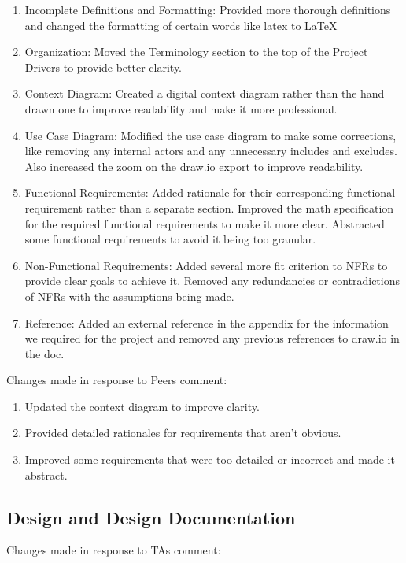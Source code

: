 \documentclass{article}
\begin{document}
	\begin{enumerate}
		\item Incomplete Definitions and Formatting: Provided more thorough definitions and changed the formatting of certain words like latex to LaTeX
		\item Organization: Moved the Terminology section to the top of the Project Drivers to provide better clarity. 
		\item Context Diagram: Created a digital context diagram rather than the hand drawn one to improve readability and make it more professional. 
		\item Use Case Diagram: Modified the use case diagram to make some corrections, like removing any internal actors and any unnecessary includes and excludes. Also increased the zoom on the draw.io export to improve readability. 
		\item Functional Requirements: Added rationale for their corresponding functional requirement rather than a separate section. Improved the math specification for the required functional requirements to make it more clear. Abstracted some functional requirements to avoid it being too granular. 
		\item Non-Functional Requirements: Added several more fit criterion to NFRs to provide clear goals to achieve it. Removed any redundancies or contradictions of NFRs with the assumptions being made. 
		\item Reference: Added an external reference in the appendix for the information we required for the project and removed any previous references to draw.io in the doc. 
	\end{enumerate}
	
	\noindent Changes made in response to Peers comment:
	
	\begin{enumerate}
		\item Updated the context diagram to improve clarity. 
		\item Provided detailed rationales for requirements that aren't obvious. 
		\item Improved some requirements that were too detailed or incorrect and made it abstract. 
	\end{enumerate}
	
	\subsection{Design and Design Documentation}
	
	Changes made in response to TAs comment:
	
\end{document}
